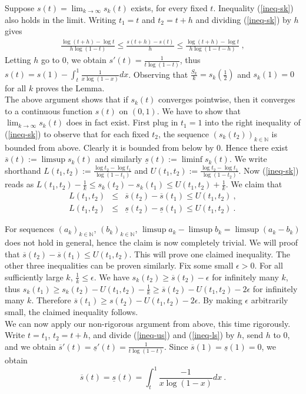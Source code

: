 \documentclass[a4paper, 11pt]{article}
\newcommand{\us}{\ensuremath{{\overline{s}}}}
\newcommand{\ls}{\ensuremath{{\underline{s}}}}
\begin{document}
Suppose $s(t) =
\lim_{k\rightarrow\infty} s_k(t)$ exists, for every fixed $t$.
Inequality (\ref{ineq-sk}) also holds in the limit. Writing $t_1=t$
and $t_2 = t+h$ and dividing (\ref{ineq-sk}) by $h$ gives
\begin{eqnarray*}
  \frac{\log (t+h) - \log t}{h\log (1-t)} \leq 
  \frac{s(t+h) - s(t)}{h}
  \leq \frac{\log (t+h) - \log t}{h\log (1-t-h)}\ ,
\end{eqnarray*}
Letting $h$ go to $0$, we obtain $s'(t) = \frac{1}{t\log(1-t)}$, thus
$s(t) = s(1) - \int_t^1 \frac{1}{x\log(1-x)} dx$. Observing that
$\frac{S_k}{k} = s_k(\frac{1}{2})$ and $s_k(1)=0$ for all $k$
proves the Lemma. \\

The above argument shows that if $s_k(t)$ converges pointwise, then it
converges to a continuous function $s(t)$ on $(0,1)$. We have to show
that $\lim_{k\rightarrow \infty} s_k(t)$ does in fact exist.  First
plug in $t_1 = 1$ into the right inequality of (\ref{ineq-sk}) to
observe that for each fixed $t_2$, the sequence $(s_k(t_2))_{k \in
  \mathbb{N}}$ is bounded from above. Clearly it is bounded from below
by $0$. Hence there exist $\us(t) := \limsup s_k(t)$ and similarly
$\ls(t):= \liminf s_k(t)$. We write shorthand $L(t_1,t_2):=\frac{\log
  t_2 - \log t_1}{\log (1-t_1)}$ and $U(t_1,t_2):=\frac{\log t_2 -
  \log t_1}{\log (1-t_2)}$. Now (\ref{ineq-sk}) reads as 
$L(t_1,t_2)-\frac{1}{k}  \leq  s_k(t_2) - s_k(t_1) \leq
U(t_1,t_2)+\frac{1}{k}$. We claim that
\begin{eqnarray}
L(t_1,t_2) & \leq & \us(t_2) - \us(t_1) \leq U(t_1,t_2) \ , \label{ineq-us}\\
L(t_1,t_2) & \leq & \ls(t_2) - \ls(t_1) \leq U(t_1,t_2) \ . \label{ineq-ls}
\end{eqnarray}


For sequences $(a_k)_{k \in \mathbb{N}}$, $(b_k)_{k \in \mathbb{N}}$,
$\limsup a_k - \limsup b_k = \limsup (a_k - b_k)$ does not hold in
general, hence the claim is now completely trivial. We will proof that
$\us(t_2) -  \us(t_1) \leq U(t_1,t_2)$.  This will
prove one claimed inequality. The other three inequalities can be
proven similarly.  Fix some small $\epsilon > 0$.  For all
sufficiently large $k$, $\frac{1}{k} \leq \epsilon$.  We have
$s_k(t_2) \geq \us(t_2) - \epsilon$ for infinitely many $k$, thus
$s_k(t_1) \geq s_k(t_2) - U(t_1,t_2) - \frac{1}{k} \geq \us(t_2) -
U(t_1,t_2) - 2\epsilon$ for infinitely many $k$.  Therefore $\us(t_1)
\geq s(t_2) - U(t_1,t_2) - 2\epsilon$.  By making $\epsilon$
arbitrarily small, the claimed inequality follows.\\

We can now apply our non-rigorous argument from above, this time
rigorously. Write $t=t_1$, $t_2 = t+h$, and divide (\ref{ineq-us}) and
(\ref{ineq-ls}) by $h$, send $h$ to $0$, and we obtain $\us'(t) =
\ls'(t) = \frac{1}{t\log(1-t)}$. Since $\us(1)=\ls(1)=0$, we obtain
$$
\us(t) = \ls(t) = \int_t^1 \frac{-1}{x\log(1-x)}dx \ .
$$
\end{document}
